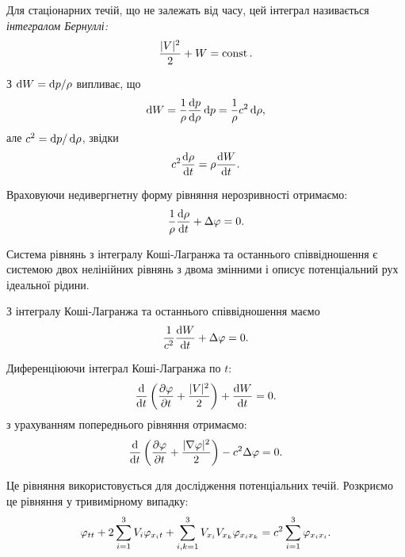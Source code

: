 \begin{definition}
	Для стаціонарних течій, що не залежать від часу, цей інтеграл називається \it{інтегралом Бернуллі}:
	\begin{equation}
		\frac{|V|^2}{2} + W = \operatorname{const}.
	\end{equation}
\end{definition}

З $\mathop{}\!\mathrm{d} W = \mathop{}\!\mathrm{d} p / \rho$ випливає, що
\begin{equation}
	\mathop{}\!\mathrm{d} W = \frac{1}{\rho} \frac{\mathop{}\!\mathrm{d} p}{\mathop{}\!\mathrm{d} \rho} \mathop{}\!\mathrm{d} p = \frac{1}{\rho} c^2 \mathop{}\!\mathrm{d} \rho,
\end{equation}
але $c^2 = \mathop{}\!\mathrm{d} p / \mathop{}\!\mathrm{d} \rho$, звідки
\begin{equation}
	c^2  \frac{\mathop{}\!\mathrm{d} \rho}{\mathop{}\!\mathrm{d} t} = \rho  \frac{\mathop{}\!\mathrm{d} W}{\mathop{}\!\mathrm{d} t}.
\end{equation}

Враховуючи недивергнетну форму рівняння нерозривності отримаємо:
\begin{equation}
	\frac{1}{\rho} \frac{\mathop{}\!\mathrm{d} \rho}{\mathop{}\!\mathrm{d} t} + \Delta \varphi = 0.
\end{equation}

Система рівнянь з інтегралу Коші-Лагранжа та останнього співвідношення є системою двох нелінійних рівнянь з двома змінними і описує потенціальний рух ідеальної рідини. \medskip

З інтегралу Коші-Лагранжа та останнього співвідношення маємо
\begin{equation}
	\frac{1}{c^2} \frac{\mathop{}\!\mathrm{d} W}{\mathop{}\!\mathrm{d} t} + \Delta \varphi = 0.
\end{equation}

Диференціюючи інтеграл Коші-Лагранжа по $t$:
\begin{equation}
	\frac{\mathop{}\!\mathrm{d}}{\mathop{}\!\mathrm{d} t} \left( \frac{\partial \varphi}{\partial t} + \frac{|V|^2}{2} \right) + \frac{\mathop{}\!\mathrm{d} W}{\mathop{}\!\mathrm{d} t} = 0.
\end{equation}
з урахуванням попереднього рівняння отримаємо:
\begin{equation}
	\frac{\mathop{}\!\mathrm{d}}{\mathop{}\!\mathrm{d} t} \left( \frac{\partial \varphi}{\partial t} + \frac{|\nabla \varphi|^2}{2} \right) - c^2 \Delta \varphi = 0.
\end{equation}

Це рівняння використовується для дослідження потенціальних течій. Розкриємо це рівняння у тривимірному випадку:
\begin{equation}
	\varphi_{tt} + 2 \displaystyle\sum\limits_{i = 1}^3 V_i \varphi_{x_i t} + \displaystyle\sum\limits_{i,k = 1}^3 V_{x_i} V_{x_k} \varphi_{x_i x_k} = c^2 \displaystyle\sum\limits_{i = 1}^3 \varphi_{x_i x_i}.
\end{equation}


